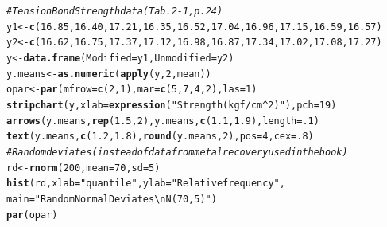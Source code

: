 \documentclass[11pt,a4paper]{memoir}\usepackage[]{graphicx}\usepackage[]{color}
\makeatletter
\newcommand{\hlnum}[1]{\textcolor[rgb]{0.686,0.059,0.569}{#1}}%
\newcommand{\hlstr}[1]{\textcolor[rgb]{0.192,0.494,0.8}{#1}}%
\newcommand{\hlcom}[1]{\textcolor[rgb]{0.678,0.584,0.686}{\textit{#1}}}%
\newcommand{\hlstd}[1]{\textcolor[rgb]{0.345,0.345,0.345}{#1}}%
\newcommand{\hlkwb}[1]{\textcolor[rgb]{0.69,0.353,0.396}{#1}}%
\newcommand{\hlkwc}[1]{\textcolor[rgb]{0.333,0.667,0.333}{#1}}%
\newcommand{\hlkwd}[1]{\textcolor[rgb]{0.737,0.353,0.396}{\textbf{#1}}}%
\newenvironment{kframe}{%
 \def\at@end@of@kframe{}%
 \ifinner\ifhmode%
  \def\at@end@of@kframe{\end{minipage}}%
  \begin{minipage}{\columnwidth}%
 \fi\fi%
 \def\FrameCommand##1{\hskip\@totalleftmargin \hskip-\fboxsep
 \colorbox{shadecolor}{##1}\hskip-\fboxsep
     \hskip-\linewidth \hskip-\@totalleftmargin \hskip\columnwidth}%
 \MakeFramed {\advance\hsize-\width
   \@totalleftmargin\z@ \linewidth\hsize
   \@setminipage}}%
 {\par\unskip\endMakeFramed%
 \at@end@of@kframe}
\newenvironment{knitrout}{}{} %
\makeatother
\begin{document}
\begin{knitrout}
\color{fgcolor}\begin{kframe}
\begin{alltt}
  \hlcom{# Tension Bond Strength data (Tab. 2-1, p. 24)}
  \hlstd{y1} \hlkwb{<-} \hlkwd{c}\hlstd{(}\hlnum{16.85}\hlstd{,}\hlnum{16.40}\hlstd{,}\hlnum{17.21}\hlstd{,}\hlnum{16.35}\hlstd{,}\hlnum{16.52}\hlstd{,}\hlnum{17.04}\hlstd{,}\hlnum{16.96}\hlstd{,}\hlnum{17.15}\hlstd{,}\hlnum{16.59}\hlstd{,}\hlnum{16.57}\hlstd{)}
  \hlstd{y2} \hlkwb{<-} \hlkwd{c}\hlstd{(}\hlnum{16.62}\hlstd{,}\hlnum{16.75}\hlstd{,}\hlnum{17.37}\hlstd{,}\hlnum{17.12}\hlstd{,}\hlnum{16.98}\hlstd{,}\hlnum{16.87}\hlstd{,}\hlnum{17.34}\hlstd{,}\hlnum{17.02}\hlstd{,}\hlnum{17.08}\hlstd{,}\hlnum{17.27}\hlstd{)}
  \hlstd{y} \hlkwb{<-} \hlkwd{data.frame}\hlstd{(}\hlkwc{Modified}\hlstd{=y1,}\hlkwc{Unmodified}\hlstd{=y2)}
  \hlstd{y.means} \hlkwb{<-} \hlkwd{as.numeric}\hlstd{(}\hlkwd{apply}\hlstd{(y,}\hlnum{2}\hlstd{,mean))}
  \hlstd{opar} \hlkwb{<-} \hlkwd{par}\hlstd{(}\hlkwc{mfrow}\hlstd{=}\hlkwd{c}\hlstd{(}\hlnum{2}\hlstd{,}\hlnum{1}\hlstd{),}\hlkwc{mar}\hlstd{=}\hlkwd{c}\hlstd{(}\hlnum{5}\hlstd{,}\hlnum{7}\hlstd{,}\hlnum{4}\hlstd{,}\hlnum{2}\hlstd{),}\hlkwc{las}\hlstd{=}\hlnum{1}\hlstd{)}
  \hlkwd{stripchart}\hlstd{(y,}\hlkwc{xlab}\hlstd{=}\hlkwd{expression}\hlstd{(}\hlstr{"Strength (kgf/cm^2)"}\hlstd{),}\hlkwc{pch}\hlstd{=}\hlnum{19}\hlstd{)}
  \hlkwd{arrows}\hlstd{(y.means,}\hlkwd{rep}\hlstd{(}\hlnum{1.5}\hlstd{,}\hlnum{2}\hlstd{),y.means,}\hlkwd{c}\hlstd{(}\hlnum{1.1}\hlstd{,}\hlnum{1.9}\hlstd{),}\hlkwc{length}\hlstd{=}\hlnum{.1}\hlstd{)}
  \hlkwd{text}\hlstd{(y.means,}\hlkwd{c}\hlstd{(}\hlnum{1.2}\hlstd{,}\hlnum{1.8}\hlstd{),}\hlkwd{round}\hlstd{(y.means,}\hlnum{2}\hlstd{),}\hlkwc{pos}\hlstd{=}\hlnum{4}\hlstd{,}\hlkwc{cex}\hlstd{=}\hlnum{.8}\hlstd{)}
  \hlcom{# Random deviates (instead of data from metal recovery used in the book)}
  \hlstd{rd} \hlkwb{<-} \hlkwd{rnorm}\hlstd{(}\hlnum{200}\hlstd{,}\hlkwc{mean}\hlstd{=}\hlnum{70}\hlstd{,}\hlkwc{sd}\hlstd{=}\hlnum{5}\hlstd{)}
  \hlkwd{hist}\hlstd{(rd,}\hlkwc{xlab}\hlstd{=}\hlstr{"quantile"}\hlstd{,}\hlkwc{ylab}\hlstd{=}\hlstr{"Relative frequency"}\hlstd{,}
       \hlkwc{main}\hlstd{=}\hlstr{"Random Normal Deviates\textbackslash{}n N(70,5)"}\hlstd{)}
  \hlkwd{par}\hlstd{(opar)}
\end{alltt}
\end{kframe}
\end{knitrout}
\end{document}
